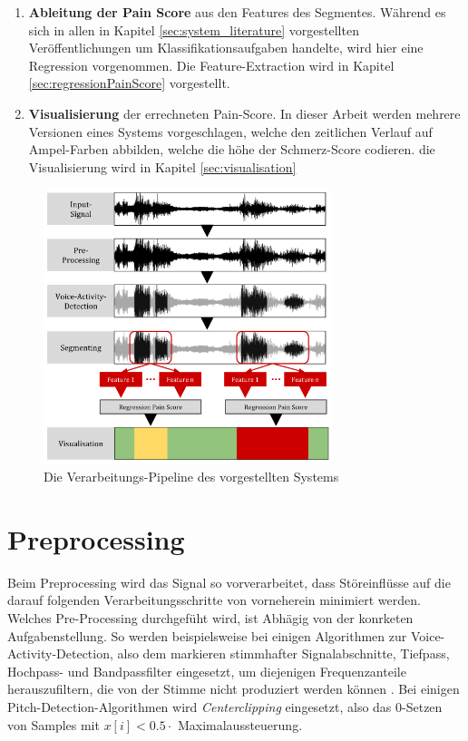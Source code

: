 \begin{enumerate}[leftmargin=*]
	\item \textbf{Ableitung der Pain Score} aus den Features des Segmentes. Während es sich in allen in Kapitel \ref{sec:system_literature} vorgestellten Veröffentlichungen um Klassifikationsaufgaben handelte, wird hier eine Regression vorgenommen. Die Feature-Extraction wird in Kapitel \ref{sec:regressionPainScore} vorgestellt.
	
	\item \textbf{Visualisierung} der errechneten Pain-Score. In dieser Arbeit werden mehrere Versionen eines Systems vorgeschlagen, welche den zeitlichen Verlauf auf Ampel-Farben abbilden, welche die höhe der Schmerz-Score codieren. die Visualisierung wird in Kapitel \ref{sec:visualisation}	
\end{enumerate}

\begin{figure}[H]
	\centering
	\includegraphics[width=0.75\textwidth]{bilder/pipeline01.png}
	\caption{Die Verarbeitungs-Pipeline des vorgestellten Systems}
	\label{img:architecture-overview}
\end{figure}

\section{Preprocessing}
\label{sec:preprocessing}

Beim Preprocessing wird das Signal so vorverarbeitet, dass Störeinflüsse auf die darauf folgenden Verarbeitungsschritte von vorneherein minimiert werden. Welches Pre-Processing durchgefüht wird, ist Abhägig von der konrketen Aufgabenstellung. So werden beispielsweise bei einigen Algorithmen zur Voice-Activity-Detection, also dem markieren stimmhafter Signalabschnitte, Tiefpass, Hochpass- und Bandpassfilter eingesetzt, um diejenigen Frequenzanteile herauszufiltern, die von der Stimme nicht produziert werden können \cite{vad_entropy} \cite{vad_ceps} \cite{vad_kola}. Bei einigen Pitch-Detection-Algorithmen wird \emph{Centerclipping} eingesetzt, also das 0-Setzen von Samples mit $ x[i] < 0.5 \cdot $ Maximalaussteuerung.\cite{czechPitch} 

